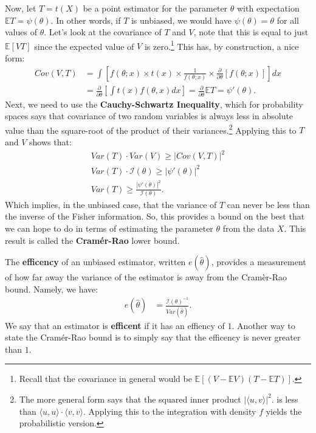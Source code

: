 \documentclass{tufte-handout}
\begin{document}
Now, let $T = t(X)$ be a point estimator for the parameter $\theta$ with
expectation $\mathbb{E}T = \psi(\theta)$. In other words, if $T$ is
unbiased, we would have $\psi(\theta) = \theta$ for all values of 
$\theta$. Let's look at the covariance of $T$ and $V$, note that this
is equal to just $\mathbb{E}[VT]$ since the expected value of $V$ is
zero.\footnote{
  Recall that the covariance in general would be $\mathbb{E}[(V - \mathbb{E}V)(T - \mathbb{E}T)]$.
} This has, by construction, a nice form:
\begin{align*}
Cov(V, T) &= \int \left[ f(\theta; x) \times t(x) \times \frac{1}{f(\theta; x)} \times \frac{\partial}{\partial \theta} \left[ f(\theta; x) \right] \right] dx \\
&= \frac{\partial}{\partial \theta} \left[ \int t(x) f(\theta, x) dx \right] = \frac{\partial}{\partial \theta} \mathbb{E}T = \psi'(\theta).
\end{align*}
Next, we need to use the \textbf{Cauchy-Schwartz Inequality}, which for
probability spaces says that covariance of two random variables is always
less in absolute value than the square-root of the product of their
variances.\footnote{
  The more general form says that the squared inner product $| \langle u, v\rangle |^2$.
  is less than $\langle u, u\rangle \cdot \langle v, v\rangle$. Applying this to
  the integration with density $f$ yields the probabilistic version.
} Applying this to $T$ and $V$ shows that:
\begin{align*}
Var(T) \cdot Var(V) \geq | Cov(V, T) |^2  \\
Var(T) \cdot \mathcal{I}(\theta) \geq | \psi'(\theta) |^2  \\
Var(T) \geq \frac{| \psi'(\theta) |^2}{\mathcal{I}(\theta)}.
\end{align*}
Which implies, in the unbiased case, that the variance of $T$ can never be
less than the inverse of the Fisher information. So, this provides a bound
on the best that we can hope to do in terms of estimating the parameter 
$\theta$ from the data $X$. This result is called the \textbf{Cramér-Rao} lower bound.

The \textbf{efficency} of an unbiased estimator, written $e(\widehat{\theta})$, 
provides a measurement of how far away the variance of the estimator is 
away from the Cramèr-Rao bound. Namely, we have:
\begin{align*}
e(\widehat{\theta}) &= \frac{\mathcal{I}(\theta)^{-1}}{Var(\widehat{\theta})}.
\end{align*}
We say that an estimator is \textbf{efficent} if it has an effiency of $1$.
Another way to state the Cramér-Rao bound is to simply say that the efficency
is never greater than $1$.
\end{document}
